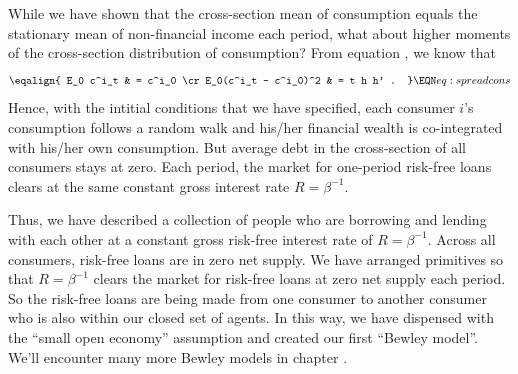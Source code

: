 While we have shown that the cross-section mean of 
consumption equals the stationary mean of non-financial 
income each period, 
what about higher moments of the 
cross-section distribution of consumption? 
From equation , we know that
$$ \eqalign{ E_0 c^i_t & = c^i_0 \cr
              E_0(c^i_t  - c^i_0)^2 & = t h h' . } 
                                 \EQN eq:spreadcons $$
Hence, with the intitial conditions that we have specified, each consumer $i$'s consumption follows a random walk and his/her financial wealth is co-integrated with his/her own consumption. But average debt in the cross-section of all consumers stays at zero.   Each period, the market for one-period risk-free loans clears at the same 
constant gross interest rate $R = \beta^{-1}$. 


Thus, we have described a collection of  people who are  borrowing and lending
with each other at a  constant gross risk-free interest rate of
$R = \beta^{-1}$.
Across all consumers, risk-free loans are in zero net supply.
We have arranged primitives so that $R = \beta^{-1}$ clears the market for risk-free loans at zero net supply each period. 
So the risk-free loans are being made from one consumer to another  consumer who is also within our closed set of agents.
In this way, we have dispensed with the ``small open economy'' assumption and created our 
first ``Bewley model''.  We'll encounter many more Bewley models in chapter .



